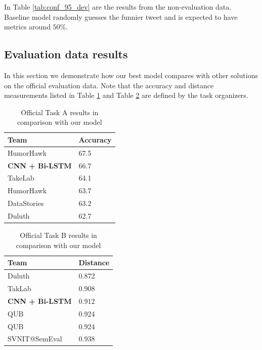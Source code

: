 \documentclass[10pt, a4paper]{article}
\begin{document}
In Table \ref{tab:conf_95_dev} are the results from the non-evaluation data.
Baseline model randomly guesses the funnier tweet and is expected to have
metrics around $50\%$.

\subsection{Evaluation data results}
In this section we demonstrate how our best model compares with other solutions on the official
evaluation data. Note that the accuracy and distance measurements listed in
Table \ref{tab:task_a_official} and Table \ref{tab:task_b_official} are
defined by the task organizers\cite{semeval_paper}.

\begin{table}
  \caption{Official Task A results in comparison with our model}
 \label{tab:task_a_official}
 \begin{center}
 \begin{tabular}{ll}
 \toprule
     Team & Accuracy\\
 \midrule
     HumorHawk & 67.5 \\
     \textbf{CNN + Bi-LSTM} & 66.7 \\
     TakeLab & 64.1\\
     HumorHawk & 63.7\\
     DataStories & 63.2\\
     Duluth & 62.7\\
 \bottomrule
 \end{tabular}
 \end{center}
\end{table}

\begin{table}
  \caption{Official Task B results in comparison with our model}
 \label{tab:task_b_official}
 \begin{center}
 \begin{tabular}{ll}
 \toprule
     Team & Distance\\
 \midrule
     Duluth & 0.872 \\
     TakLab & 0.908\\
     \textbf{CNN + Bi-LSTM} & 0.912 \\
     QUB & 0.924\\
     QUB & 0.924\\
     SVNIT@SemEval & 0.938\\
 \bottomrule
 \end{tabular}
 \end{center}
\end{table}
\end{document}
